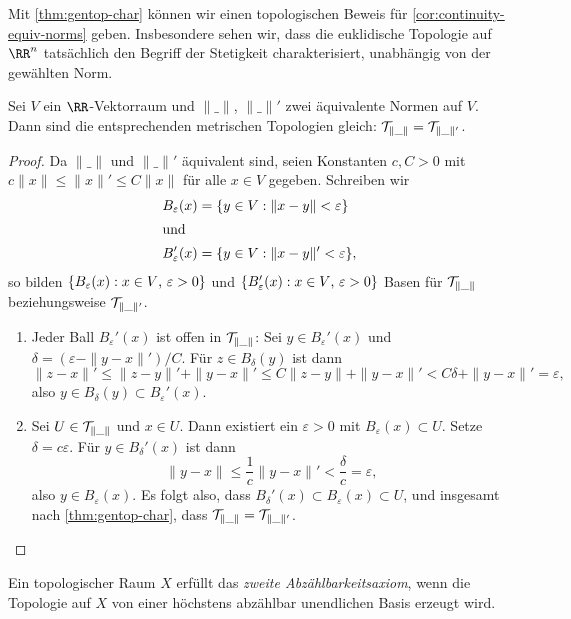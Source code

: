 Mit \autoref{thm:gentop-char} können wir einen topologischen Beweis für
\autoref{cor:continuity-equiv-norms} geben. Insbesondere sehen wir, dass die
euklidische Topologie auf $\RR^n$ tatsächlich den Begriff der Stetigkeit
charakterisiert, unabhängig von der gewählten Norm.
\begin{theorem}
Sei $V$ ein $\RR$-Vektorraum und $\|\_\|$, $\|\_\|'$ zwei äquivalente Normen
auf $V$. Dann sind die entsprechenden metrischen Topologien gleich: $\cal
T_{\|\_\|} = \cal T_{\|\_\|'}$.
\end{theorem}
\begin{proof}
Da $\|\_\|$ und $\|\_\|'$ äquivalent sind, seien Konstanten $c,C>0$ mit
$c\|x\|\leq \|x\|' \leq C\|x\|$ für alle $x\in V$ gegeben. Schreiben wir
\begin{align*}
B_\varepsilon(x) &= \{y\in V : \|x-y\|<\varepsilon\} \\
\shortintertext{und} B'_\varepsilon(x) &= \{y\in V : \|x-y\|'<\varepsilon\},
\end{align*}
so bilden $\{B_\varepsilon(x) : \textnormal{$x\in V$, $\varepsilon>0$}\}$ und
$\{B'_\varepsilon(x) : \textnormal{$x\in V$, $\varepsilon>0$}\}$ Basen für $\cal T_{\|\_\|}$
beziehungsweise $\cal T_{\|\_\|'}$.
\begin{enumerate}
\item Jeder Ball $B_\varepsilon'(x)$ ist offen in $\cal T_{\|\_\|}$: Sei $y\in
B_\varepsilon'(x)$ und $\delta = (\varepsilon - \|y-x\|')/C$. Für $z\in
B_\delta(y)$ ist dann
\[
\|z-x\|'\leq \|z -y\|' + \|y-x\|' \leq C\|z-y\| + \|y-x\|' < C\delta + \|y-x\|'
= \varepsilon,
\]
also $y\in B_\delta(y)\subset B_\varepsilon'(x)$.
\item Sei $U\in\cal T_{\|\_\|}$ und $x\in U$. Dann existiert ein $\varepsilon>0$
mit $B_\varepsilon(x)\subset U$. Setze $\delta = c\varepsilon$. Für $y\in
B_\delta'(x)$ ist dann
\[
\|y-x\| \leq \frac{1}{c}\|y-x\|' < \frac{\delta}{c} = \varepsilon,
\]
also $y\in B_\varepsilon(x)$. Es folgt also, dass $B_\delta'(x)\subset
B_\varepsilon(x)\subset U$, und insgesamt nach \autoref{thm:gentop-char}, dass
$\cal T_{\|\_\|} = \cal T_{\|\_\|'}$.\qedhere
\end{enumerate}
\end{proof}

\begin{definition}
Ein topologischer Raum $X$ erfüllt das \emph{zweite Abzählbarkeitsaxiom}, wenn die
Topologie auf $X$ von einer höchstens abzählbar unendlichen Basis erzeugt wird.
\end{definition}

